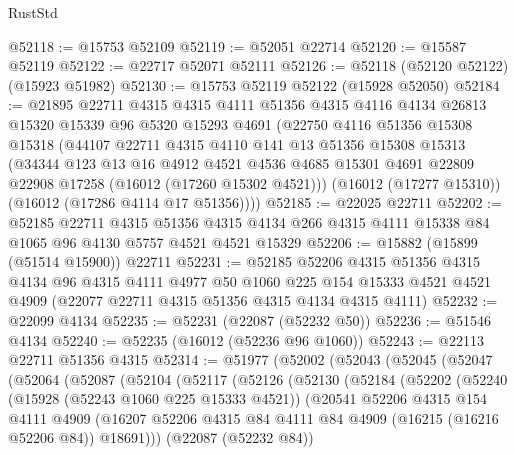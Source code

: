 \begin{lexlean}{RustStd}
\begin{coremodule}
@52118 := @15753 @52109
@52119 := @52051 @22714
@52120 := @15587 @52119
@52122 := @22717 @52071 @52111
@52126 := @52118 (@52120 @52122) (@15923 @51982)
@52130 := @15753 @52119 @52122 (@15928 @52050)
@52184 := @21895
    @22711
    @4315
    @4315
    @4111
    @51356
    @4315
    @4116
    @4134
    @26813
    @15320
    @15339
    @96
    @5320
    @15293
    @4691
    (@22750
      @4116
      @51356
      @15308
      @15318
      (@44107
        @22711
        @4315
        @4110
        @141
        @13
        @51356
        @15308
        @15313
        (@34344
          @123
          @13
          @16
          @4912
          @4521
          @4536
          @4685
          @15301
          @4691
          @22809
          @22908
          @17258
          (@16012 (@17260 @15302 @4521)))
        (@16012 (@17277 @15310))
        (@16012 (@17286 @4114 @17 @51356))))
@52185 := @22025 @22711
@52202 := @52185
    @22711
    @4315
    @51356
    @4315
    @4134
    @266
    @4315
    @4111
    @15338
    @84
    @1065
    @96
    @4130
    @5757
    @4521
    @4521
    @15329
@52206 := @15882 (@15899 (@51514 @15900)) @22711
@52231 := @52185
    @52206
    @4315
    @51356
    @4315
    @4134
    @96
    @4315
    @4111
    @4977
    @50
    @1060
    @225
    @154
    @15333
    @4521
    @4521
    @4909
    (@22077 @22711 @4315 @51356 @4315 @4134 @4315 @4111)
@52232 := @22099 @4134
@52235 := @52231 (@22087 (@52232 @50))
@52236 := @51546 @4134
@52240 := @52235 (@16012 (@52236 @96 @1060))
@52243 := @22113 @22711 @51356 @4315
@52314 := @51977
    (@52002
      (@52043
        (@52045
          (@52047
            (@52064
              (@52087
                (@52104
                  (@52117
                    (@52126
                      (@52130
                        (@52184
                          (@52202
                            (@52240
                              (@15928 (@52243 @1060 @225 @15333 @4521))
                              (@20541
                                @52206
                                @4315
                                @154
                                @4111
                                @4909
                                (@16207
                                  @52206
                                  @4315
                                  @84
                                  @4111
                                  @84
                                  @4909
                                  (@16215 (@16216 @52206 @84))
                                  @18691)))
                            (@22087 (@52232 @84))

\end{coremodule}
\end{lexlean}
